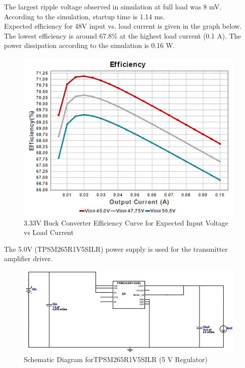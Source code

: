 \documentclass[12pt]{article}
\begin{document}
\noindent
The largest ripple voltage observed in simulation at full load was 8 mV.\\

\noindent
According to the simulation, startup time is 1.14 ms.\\

\noindent
Expected efficiency for 48V input vs. load current is given in the graph below. The lowest efficiency is around 67.8\% at the highest load current (0.1 A). The power dissipation according to the simulation is 0.16 W.

\pagebreak

\begin{figure}[h!]
\centering
\includegraphics[width=0.9\linewidth]{3V_eff}
\caption{3.33V Buck Converter Efficiency Curve for Expected Input Voltage vs Load Current}
\end{figure}

\noindent
The 5.0V (TPSM265R1V5SILR) power supply is used for the transmitter amplifier driver.

\begin{figure}[h!]
\centering
\includegraphics[width=0.9\linewidth]{5V_schem}
\caption{Schematic Diagram forTPSM265R1V5SILR (5 V Regulator)}
\end{figure}
\end{document}
